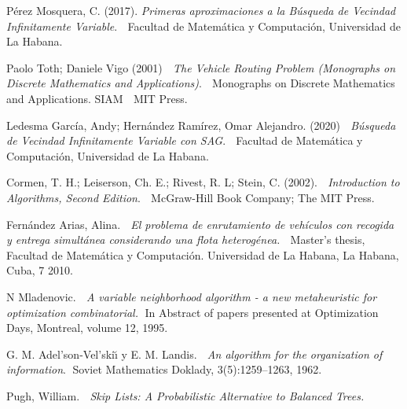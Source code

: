 \documentclass[a4paper,10pt,twocolumn]{article}
\begin{document}
\begin{thebibliography}{99}
	 Pérez Mosquera, C. (2017).	\emph{Primeras aproximaciones 
	a la Búsqueda de Vecindad Infinitamente Variable}. $\;$ Facultad de Matemática y 
	Computación, Universidad de La Habana.
	
	 Paolo Toth; Daniele Vigo (2001) $\;$ \textit{The Vehicle Routing 
	Problem (Monographs on Discrete Mathematics and Applications)}. $\;$ Monographs on 
	Discrete Mathematics and Applications. SIAM $\;$ MIT Press.
	
	 Ledesma García, Andy; Hernández Ramírez, Omar Alejandro. (2020) $\;$
	\textit{Búsqueda de Vecindad Infinitamente Variable con SAG}. $\;$ Facultad de
	Matemática y Computación, Universidad de La Habana.
	
	 Cormen, T. H.; Leiserson, Ch. E.; Rivest, R. L; Stein, C. (2002).
	$\;$ \textit{Introduction to Algorithms, Second Edition}. $\;$ McGraw-Hill Book 
	Company; The MIT Press.
	
	  Fernández Arias, Alina. $\;$ \textit{El problema de enrutamiento de 
	vehículos con recogida y entrega simultánea considerando una flota heterogénea.} 
	$\;$ Master’s thesis, Facultad de Matemática y Computación. Universidad de La Habana, 
	La Habana, Cuba, 7 2010.
	
	 N Mladenovic. $\;$ \textit{A variable neighborhood algorithm - a new 
	metaheuristic for optimization combinatorial.}$\;$ In Abstract of papers presented at 
	Optimization Days, Montreal, volume 12, 1995.
	
	 G. M. Adel’son-Vel’ski\u{\i} y E. M. Landis. $\;$
	\textit{An algorithm for the organization of information}.$\;$ Soviet Mathematics 
	Doklady, 3(5):1259–1263, 1962.
	
	 Pugh, William. $ \; $ \textit{Skip Lists: A Probabilistic Alternative to
	Balanced Trees.}

\end{thebibliography}


\label{end}
\end{document}

